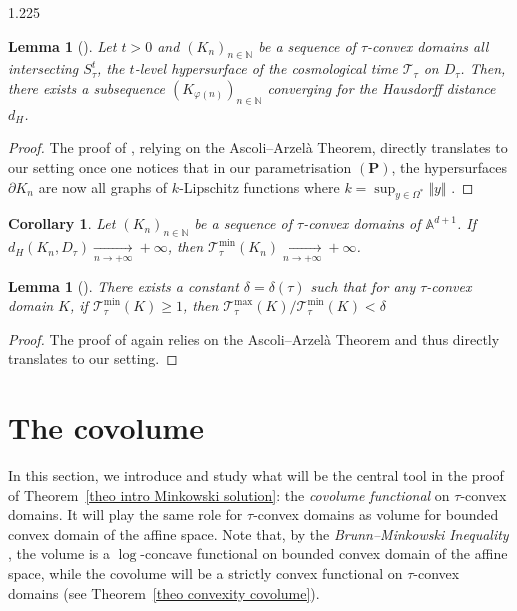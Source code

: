 \documentclass[reqno, a4paper]{amsart}
\numberwithin{equation}{section}
\numberwithin{figure}{section}
\newtheorem{corollary}[theorem]{Corollary}
\newtheorem{lemma}[theorem]{Lemma}
\theoremstyle{definition}
\theoremstyle{remark}
\newcommand{\N}{\mathbb{N}} %
\newcommand{\A}{\mathbb{A}} %
\begin{document}
\begin{spacing}{1.225}
\begin{lemma}[{\cite[Lemma~3.17]{Bonsante_Fillastre_17}}]
\label{lem exctraction of tau-convex domains}
Let $t>0$ and $(K_n)_{n\in\N}$ be a sequence of $\tau$-convex domains all intersecting $S_\tau^t$, the $t$-level hypersurface of the cosmological time $\mathcal{T}_\tau$ on $D_\tau$. Then, there exists a subsequence $(K_{\varphi(n)})_{n\in\N}$ converging for the Hausdorff distance $d_H$. 
\end{lemma}
\begin{proof}
The proof of \cite{Bonsante_Fillastre_17}, relying on the Ascoli--Arzel\`a Theorem, directly translates to our setting once one notices that in our parametrisation $(\mathbf{P})$, the hypersurfaces $\partial K_n$ are now all graphs of $k$-Lipschitz functions where $k = \sup_{y \in \Omega^*} \Vert y \Vert$ \cite[Corollary~13.3.3]{Rockafellar_97}. 
\end{proof}

\begin{corollary}
\label{cor min cosmo time}
Let $(K_n)_{n\in\N}$ be a sequence of $\tau$-convex domains of $\A^{d+1}$. If $d_H(K_n,D_\tau)\xrightarrow[n\to+\infty]{}+\infty$, then $\mathcal{T}_\tau^{\min} (K_n) \xrightarrow[n\to+\infty]{}+\infty$. 
\end{corollary}

\begin{lemma}[{\cite[Lemma~3.20]{Bonsante_Fillastre_17}}]
\label{lem ration minmax cosmo time}
There exists a constant $\delta=\delta(\tau)$ such that for any $\tau$-convex domain $K$, if $\mathcal{T}_\tau^{\min} (K) \geq 1$, then $\mathcal{T}_\tau^{\max} (K)/\mathcal{T}_\tau^{\min} (K) < \delta$
\end{lemma}
\begin{proof}
The proof of \cite{Bonsante_Fillastre_17} again relies on the Ascoli--Arzel\`a Theorem and thus directly translates to our setting. 
\end{proof}

\section{The covolume}
\label{sec covolume}

In this section, we introduce and study what will be the central tool in the proof of Theorem~\ref{theo intro Minkowski solution}: the \emph{covolume functional} on $\tau$-convex domains. It will play the same role for $\tau$-convex domains as volume for bounded convex domain of the affine space. Note that, by the \emph{Brunn--Minkowski Inequality} \cite[Theorem~7.1.1]{Schneider_93}, the volume is a $\log$-concave functional on bounded convex domain of the affine space, while the covolume will be a strictly convex functional on $\tau$-convex domains (see Theorem~\ref{theo convexity covolume}).


\end{spacing}
\end{document}
